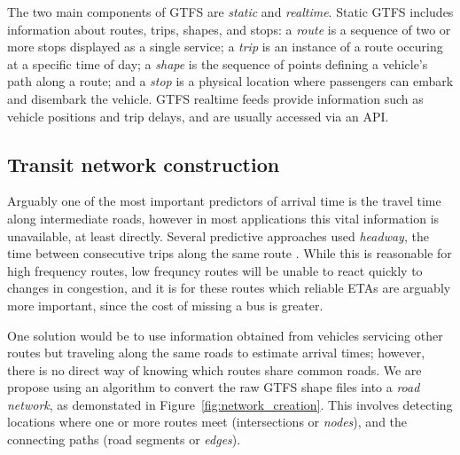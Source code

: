 \documentclass[times, doublespace]{anzsauth}
\begin{document}
The two main components of GTFS are \emph{static} and \emph{realtime}.
Static GTFS includes information about routes, trips, shapes, and stops:
a \emph{route} is a sequence of two or more stops displayed as a single service;
a \emph{trip} is an instance of a route occuring at a specific time of day;
a \emph{shape} is the sequence of points defining a vehicle's path along a route;
and a \emph{stop} is a physical location where passengers can embark and disembark
the vehicle.
GTFS realtime feeds provide information such as vehicle positions and trip delays,
and are usually accessed via an API.


\subsection{Transit network construction}
\label{sec:network_build}

Arguably one of the most important predictors of arrival time is
the travel time along intermediate roads,
however in most applications this vital information is unavailable,
at least directly. 
Several predictive approaches used \emph{headway},
the time between consecutive trips along the same route
\citep{Hans_2015}.
While this is reasonable for high frequency routes,
low frequncy routes will be unable to react quickly to changes in congestion,
and it is for these routes which reliable ETAs are arguably more important,
since the cost of missing a bus is greater.


One solution would be to use information obtained from
vehicles servicing other routes but traveling along the same roads
to estimate arrival times;
however, there is no direct way of knowing which routes share common roads.
We are propose using an algorithm to convert the raw GTFS shape files
into a \emph{road network},
as demonstated in Figure~\ref{fig:network_creation}.
This involves detecting locations where one or more routes meet 
(intersections or \emph{nodes}),
and the connecting paths (road segments or \emph{edges}).






\end{document}
